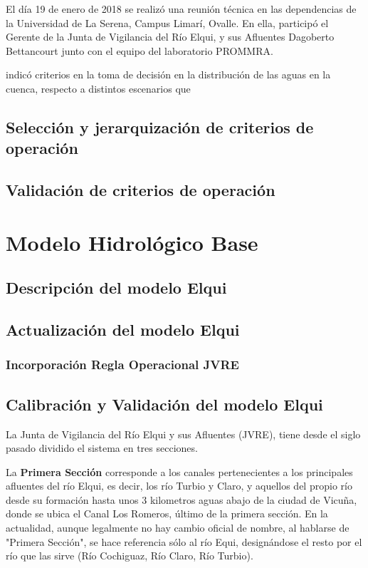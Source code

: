 \documentclass[10pt,]{article}
\begin{document}
		El día 19 de enero de 2018 se realizó una reunión técnica en las dependencias de la Universidad de La Serena, Campus Limarí, Ovalle. En ella, participó el Gerente de la Junta de Vigilancia del Río Elqui,  y sus Afluentes Dagoberto Bettancourt junto con el equipo del laboratorio PROMMRA.
		
		indicó criterios en la toma de decisión en la distribución de las aguas en la cuenca, respecto a distintos escenarios que 
		
		
		\subsection{Selección y jerarquización de criterios de operación}
		\subsection{Validación de criterios de operación}\bigskip

\section{Modelo Hidrológico Base}\bigskip

		\subsection{Descripción del modelo Elqui}
		\subsection{Actualización del modelo Elqui}\bigskip
		
			\subsubsection{Incorporación Regla Operacional JVRE}\bigskip
			
		\subsection{Calibración y Validación del modelo Elqui}
		

La Junta de Vigilancia del Río Elqui y sus Afluentes (JVRE), tiene desde el siglo pasado dividido el sistema en tres secciones.\bigskip

La \textbf {Primera Sección} corresponde a los canales pertenecientes a los principales afluentes del río Elqui, es decir, los río Turbio y Claro, y aquellos del propio río desde su formación hasta unos 3 kilometros aguas abajo de la ciudad de Vicuña, donde se ubica el Canal Los Romeros, último de la primera sección. En la actualidad, aunque legalmente no hay cambio oficial de nombre, al hablarse de "Primera Sección", se hace referencia sólo al río Equi, designándose el resto por el río que las sirve (Río Cochiguaz, Río Claro, Río Turbio).\bigskip
\end{document}
